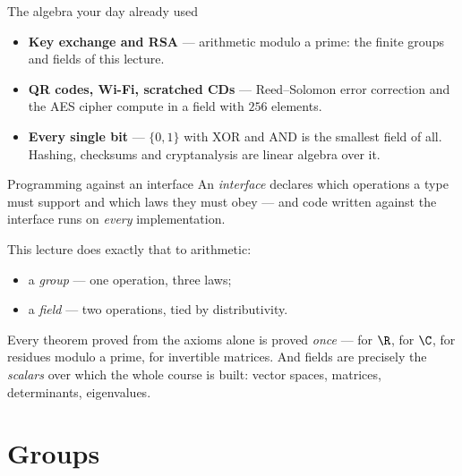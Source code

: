 \begin{frame}{The algebra your day already used}
\begin{itemize}
\item \textbf{Key exchange and RSA} — arithmetic modulo a prime: the finite
groups and fields of this lecture.
\pause
\item \textbf{QR codes, Wi-Fi, scratched CDs} — Reed--Solomon error correction
and the AES cipher compute in a field with $256$ elements.
\pause
\item \textbf{Every single bit} — $\{0,1\}$ with XOR and AND is the smallest
field of all. Hashing, checksums and cryptanalysis are linear algebra over it.
\end{itemize}
\end{frame}

\begin{frame}{Programming against an interface}
An \emph{interface} declares which operations a type must support and which
laws they must obey — and code written against the interface runs on
\emph{every} implementation.

\pause

This lecture does exactly that to arithmetic:

\begin{itemize}
\item a \emph{group} — one operation, three laws;
\item a \emph{field} — two operations, tied by distributivity.
\end{itemize}

\pause

\begin{remark}
Every theorem proved from the axioms alone is proved \emph{once} — for
$\R$, for $\C$, for residues modulo a prime, for invertible matrices.
And fields are precisely the \emph{scalars} over which the whole course
is built: vector spaces, matrices, determinants, eigenvalues.
\end{remark}
\end{frame}

\section{Groups}

